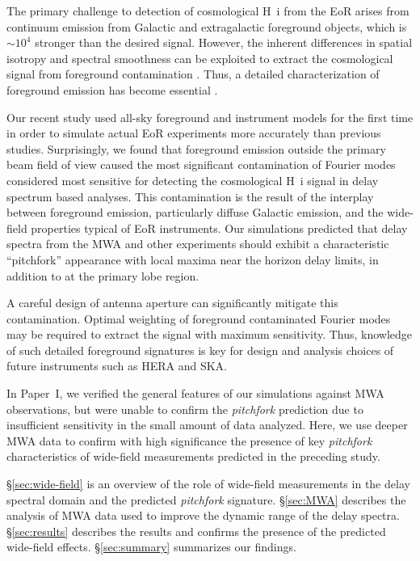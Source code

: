 \documentclass[preprint2,apjl,numberedappendix,twocolappendix,appendixfloats]{emulateapj}
\begin{document}
The primary challenge to detection of cosmological H~{\sc i} from the EoR arises from continuum emission from Galactic and extragalactic foreground objects, which is $\sim 10^4$ stronger than the desired signal. However, the inherent differences in spatial isotropy and spectral smoothness can be exploited to extract the cosmological signal from foreground contamination \citep[see, e.g.,][]{dim02,dim04,zal04,fur04,mor04,san05,fur06,mcq06,mor06,wan06,gle08}. Thus, a detailed characterization of foreground emission has become essential \citep{ali08,bow09,liu09,ber09,ber10,dat10,liu11,gho12,mor12,par12b,tro12,pob13,dil13,dil14,liu14a,liu14b,thy13,thy15}.

Our recent study \citep[][hereafter referred to as Paper~I]{thy15} used all-sky foreground and instrument models for the first time in order to simulate actual EoR experiments more accurately than previous studies. Surprisingly, we found that foreground emission outside the primary beam field of view caused the most significant contamination of Fourier modes considered most sensitive for detecting the cosmological H~{\sc i} signal in delay spectrum based analyses. This contamination is the result of the interplay between foreground emission, particularly diffuse Galactic emission, and the wide-field properties typical of EoR instruments. Our simulations predicted that delay spectra from the MWA and other experiments should exhibit a characteristic ``pitchfork'' appearance with local maxima near the horizon delay limits, in addition to at the primary lobe region.  

A careful design of antenna aperture can significantly mitigate this contamination. Optimal weighting of foreground contaminated Fourier modes may be required to extract the signal with maximum sensitivity. Thus, knowledge of such detailed foreground signatures is key for design and analysis choices of future instruments such as HERA and SKA.

In Paper~I, we verified the general features of our simulations against MWA observations, but were unable to confirm the {\it pitchfork} prediction due to insufficient sensitivity in the small amount of data analyzed. Here, we use deeper MWA data to confirm with high significance the presence of key {\it pitchfork} characteristics of wide-field measurements predicted in the preceding study.  

\S\ref{sec:wide-field} is an overview of the role of wide-field measurements in the delay spectral domain and the predicted {\it pitchfork} signature. \S\ref{sec:MWA} describes the analysis of MWA data used to improve the dynamic range of the delay spectra. \S\ref{sec:results} describes the results and confirms the presence of the predicted wide-field effects. \S\ref{sec:summary} summarizes our findings.
\end{document}
